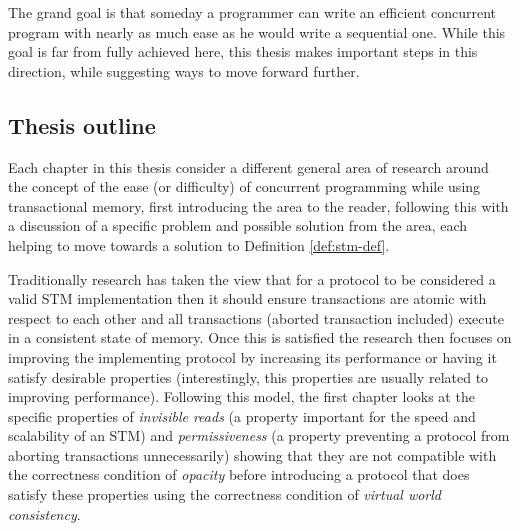 The grand goal is that someday a programmer can write an efficient concurrent program
with nearly as much ease as he would write a sequential one.
While this goal is far from fully achieved here,
this thesis makes important steps in this direction, while suggesting ways to move forward further.








\subsection{Thesis outline}

Each chapter in this thesis consider a different general area of research around
the concept of the ease (or difficulty) of concurrent programming while using transactional memory, first introducing
the area to the reader, following this with a discussion of a specific problem
and possible solution from the area, each helping to move towards a solution to Definition \ref{def:stm-def}.


Traditionally research has taken the view that for a protocol to be considered a valid STM
implementation then it should ensure transactions
are atomic with respect to each other and all transactions (aborted transaction included)
execute in a consistent state of memory.
Once this is satisfied the research then focuses on improving the implementing protocol
by increasing its performance or having it satisfy desirable properties
(interestingly, this properties are usually related to improving performance).
Following this model, the first chapter looks at the specific properties of \emph{invisible reads}
(a property important for the speed and scalability of an STM) and
\emph{permissiveness} (a property preventing a protocol from aborting transactions unnecessarily)
showing that they are not compatible with the correctness condition
of \emph{opacity} before introducing a protocol that does satisfy these properties using
the correctness condition of \emph{virtual world consistency}.

